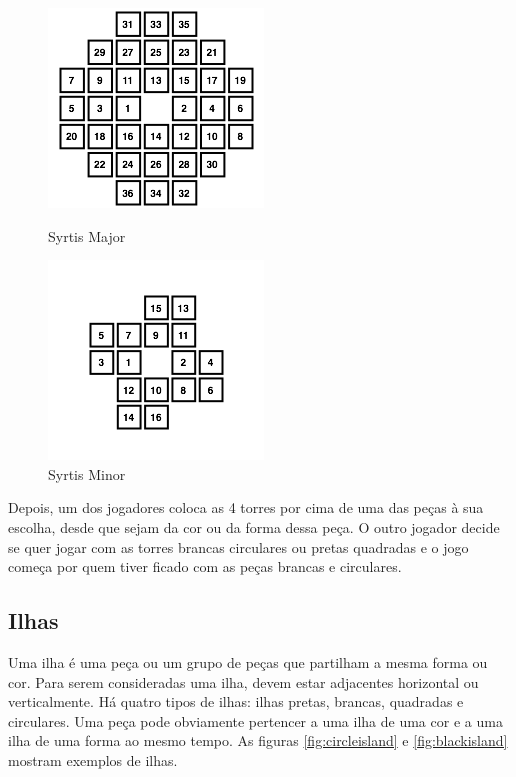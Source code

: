 \documentclass[a4paper]{article}
\begin{document}
\begin{figure}[h]

\begin{minipage}{0.5\linewidth}
\centering
\includegraphics[scale=0.9]{syrtismajor.png}
\caption{Syrtis Major}
\label{fig:syrtismajor}
\end{minipage}
\quad
\begin{minipage}{0.5\linewidth}
\centering
\includegraphics[scale=0.9]{syrtisminor.png}
\caption{Syrtis Minor}
\label{fig:syrtisminor}
\end{minipage}

\end{figure}

Depois, um dos jogadores coloca as 4 torres por cima de uma das peças à sua escolha, desde que sejam da cor ou da forma dessa peça. O outro jogador decide se quer jogar com as torres brancas circulares ou pretas quadradas e o jogo começa por quem tiver ficado com as peças brancas e circulares.

\subsection{Ilhas}

Uma ilha é uma peça ou um grupo de peças que partilham a mesma forma ou cor. Para serem consideradas uma ilha, devem estar adjacentes horizontal ou verticalmente. Há quatro tipos de ilhas: ilhas pretas, brancas, quadradas e circulares. Uma peça pode obviamente pertencer a uma ilha de uma cor e a uma ilha de uma forma ao mesmo tempo. As figuras \ref{fig:circleisland} e \ref{fig:blackisland} mostram exemplos de ilhas.
\end{document}
